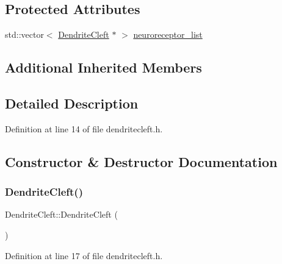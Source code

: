 \subsection*{Protected Attributes}
\begin{DoxyCompactItemize}
\item 
std\+::vector$<$ \hyperlink{class_dendrite_cleft}{Dendrite\+Cleft} $\ast$ $>$ \hyperlink{class_dendrite_cleft_a42de9c556ce58c9f511031361755a0c3}{neuroreceptor\+\_\+list}
\end{DoxyCompactItemize}
\subsection*{Additional Inherited Members}


\subsection{Detailed Description}


Definition at line 14 of file dendritecleft.\+h.



\subsection{Constructor \& Destructor Documentation}
\mbox{\label{class_dendrite_cleft_a244a2e6377fafdf79df757d39a2684e5}} 
\subsubsection{\texorpdfstring{Dendrite\+Cleft()}{DendriteCleft()}\hspace{0.1cm}{\footnotesize\ttfamily [1/4]}}
{\footnotesize\ttfamily Dendrite\+Cleft\+::\+Dendrite\+Cleft (\begin{DoxyParamCaption}{ }\end{DoxyParamCaption})\hspace{0.3cm}{\ttfamily [inline]}}



Definition at line 17 of file dendritecleft.\+h.

\mbox{\label{class_dendrite_cleft_a335660dfc63f55980b2dcf8849568086}} 
